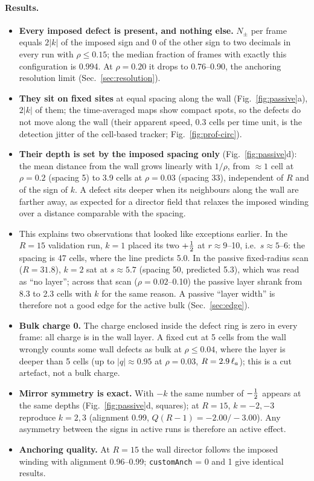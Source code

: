 \paragraph{Results.}
\begin{itemize}
  \item \textbf{Every imposed defect is present, and nothing else.} $N_\pm$ per frame equals $2|k|$ of the imposed sign
        and 0 of the other sign to two decimals in every run with $\rho\le0.15$; the median fraction of frames with exactly
        this configuration is 0.994. At $\rho=0.20$ it drops to 0.76--0.90, the anchoring resolution limit
        (Sec.~\ref{sec:resolution}).
  \item \textbf{They sit on fixed sites} at equal spacing along the wall (Fig.~\ref{fig:passive}a), $2|k|$ of them;
        the time-averaged maps show compact spots, so the defects do not move along the wall (their apparent speed,
        0.3 cells per time unit, is the detection jitter of the cell-based tracker; Fig.~\ref{fig:prof-circ}).
  \item \textbf{Their depth is set by the imposed spacing only} (Fig.~\ref{fig:passive}d): the mean distance from the wall
        grows linearly with $1/\rho$, from $\approx1$ cell at $\rho=0.2$ (spacing 5) to 3.9 cells at $\rho=0.03$ (spacing 33),
        independent of $R$ and of the sign of $k$. A defect sits deeper when its neighbours along the wall are farther
        away, as expected for a director field that relaxes the imposed winding over a distance comparable with the spacing.
  \item This explains two observations that looked like exceptions earlier. In the $R=15$ validation run, $k=1$ placed its
        two $+\tfrac12$ at $r\approx9$--10, i.e.\ $s\approx5$--6: the spacing is 47 cells, where the line predicts 5.0. In the
        passive fixed-radius scan ($R=31.8$), $k=2$ sat at $s\approx5.7$ (spacing 50, predicted 5.3), which was read as
        ``no layer''; across that scan ($\rho=0.02$--0.10) the passive layer shrank from 8.3 to 2.3 cells with $k$ for the same
        reason. A passive ``layer width'' is therefore not a good edge for the active bulk (Sec.~\ref{sec:edge}).
  \item \textbf{Bulk charge 0.} The charge enclosed inside the defect ring is zero in every frame: all charge is in the
        wall layer. A fixed cut at 5 cells from the wall wrongly counts some wall defects as bulk at $\rho\le0.04$, where
        the layer is deeper than 5 cells (up to $|q|\approx0.95$ at $\rho=0.03$, $R=2.9\,\ell_a$); this is a cut artefact, not
        a bulk charge.
  \item \textbf{Mirror symmetry is exact.} With $-k$ the same number of $-\tfrac12$ appears at the same depths
        (Fig.~\ref{fig:passive}d, squares); at $R=15$, $k=-2,-3$ reproduce $k=2,3$ (alignment 0.99, $Q(R-1)=-2.00/-3.00$).
        Any asymmetry between the signs in active runs is therefore an active effect.
  \item \textbf{Anchoring quality.} At $R=15$ the wall director follows the imposed winding with alignment 0.96--0.99;
        \texttt{customAnch} = 0 and 1 give identical results.
\end{itemize}
